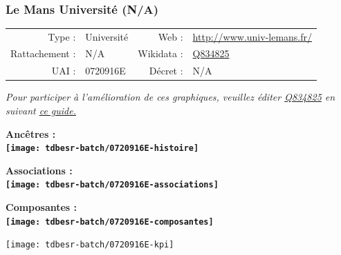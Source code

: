 \documentclass[12pt,french,]{article}
\begin{document}
\ifoddpage \fi ~\newpage  

\hypertarget{le-mans-universituxe9-na}{%
\subsubsection{Le Mans Université
(N/A)}\label{le-mans-universituxe9-na}}

\begin{tabular*}{\textwidth}{rp{5cm}rl}  
\hline  
Type : & Université & Web : &\href{http://www.univ-lemans.fr/}{http://www.univ-lemans.fr/} \\  
Rattachement : & N/A & Wikidata : & \href{https://www.wikidata.org/entity/Q834825}{Q834825} \\  
UAI : & 0720916E & Décret : & N/A \\  
\hline  
\end{tabular*}

\textit{\scriptsize Pour participer à l'amélioration de ces graphiques, veuillez éditer  \href{https://www.wikidata.org/entity/Q834825}{Q834825}  en suivant \href{https://github.com/cpesr/wikidataESR/blob/master/Rmd/wikidataESR.md}{ce guide.}}

\vspace{1cm}  
\begin{minipage}[b]{0.50\textwidth}\begin{center} \bf Ancêtres : \\  
\texttt{[image: tdbesr-batch/0720916E-histoire]} \end{center}\end{minipage}\begin{minipage}[b]{0.50\textwidth}\begin{center} \bf Associations : \\  
\texttt{[image: tdbesr-batch/0720916E-associations]} \end{center}\end{minipage}

\hrulefill

\begin{center} \bf Composantes : \\  
\texttt{[image: tdbesr-batch/0720916E-composantes]} \end{center}

\begin{center}\texttt{[image: tdbesr-batch/0720916E-kpi]} \end{center}\checkoddpage

\ifoddpage \fi ~\newpage  
\end{document}
